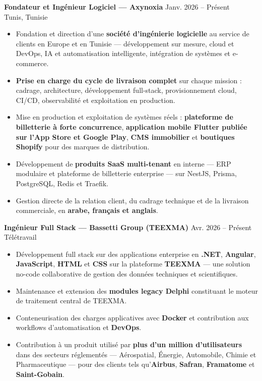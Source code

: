 \documentclass[10pt, letterpaper]{article}
\newenvironment{highlights}{
\begin{itemize}[leftmargin=12pt, itemsep=2pt]
}{
\end{itemize}
}
\begin{document}
\textbf{Fondateur et Ingénieur Logiciel --- Axynoxia} \hfill Janv. 2026 -- Présent \\
Tunis, Tunisie
\begin{highlights}
\item Fondation et direction d'une \textbf{société d'ingénierie logicielle} au service de clients en Europe et en Tunisie --- développement sur mesure, cloud et DevOps, IA et automatisation intelligente, intégration de systèmes et e-commerce.
\item \textbf{Prise en charge du cycle de livraison complet} sur chaque mission : cadrage, architecture, développement full-stack, provisionnement cloud, CI/CD, observabilité et exploitation en production.
\item Mise en production et exploitation de systèmes réels : \textbf{plateforme de billetterie à forte concurrence}, \textbf{application mobile Flutter publiée sur l'App Store et Google Play}, \textbf{CMS immobilier} et \textbf{boutiques Shopify} pour des marques de distribution.
\item Développement de \textbf{produits SaaS multi-tenant} en interne --- ERP modulaire et plateforme de billetterie enterprise --- sur NestJS, Prisma, PostgreSQL, Redis et Traefik.
\item Gestion directe de la relation client, du cadrage technique et de la livraison commerciale, en \textbf{arabe, français et anglais}.
\end{highlights}

\textbf{Ingénieur Full Stack --- Bassetti Group (TEEXMA)} \hfill Avr. 2026 -- Présent \\
Télétravail
\begin{highlights}
\item Développement full stack sur des applications enterprise en \textbf{.NET}, \textbf{Angular}, \textbf{JavaScript}, \textbf{HTML} et \textbf{CSS} sur la plateforme \textbf{TEEXMA} --- une solution no-code collaborative de gestion des données techniques et scientifiques.
\item Maintenance et extension des \textbf{modules legacy Delphi} constituant le moteur de traitement central de TEEXMA.
\item Conteneurisation des charges applicatives avec \textbf{Docker} et contribution aux workflows d'automatisation et \textbf{DevOps}.
\item Contribution à un produit utilisé par \textbf{plus d'un million d'utilisateurs} dans des secteurs réglementés --- Aérospatial, Énergie, Automobile, Chimie et Pharmaceutique --- pour des clients tels qu'\textbf{Airbus}, \textbf{Safran}, \textbf{Framatome} et \textbf{Saint-Gobain}.
\end{highlights}
\end{document}
